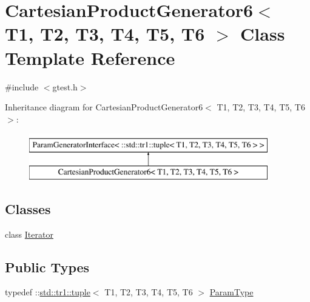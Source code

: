 \hypertarget{classtesting_1_1internal_1_1CartesianProductGenerator6}{\section{\-Cartesian\-Product\-Generator6$<$ \-T1, \-T2, \-T3, \-T4, \-T5, \-T6 $>$ \-Class \-Template \-Reference}
\label{d3/d9a/classtesting_1_1internal_1_1CartesianProductGenerator6}
}


{\ttfamily \#include $<$gtest.\-h$>$}

\-Inheritance diagram for \-Cartesian\-Product\-Generator6$<$ \-T1, \-T2, \-T3, \-T4, \-T5, \-T6 $>$\-:\begin{figure}[H]
\begin{center}
\leavevmode
\includegraphics[height=2.000000cm]{d3/d9a/classtesting_1_1internal_1_1CartesianProductGenerator6}
\end{center}
\end{figure}
\subsection*{\-Classes}
\begin{DoxyCompactItemize}
\item 
class \hyperlink{classtesting_1_1internal_1_1CartesianProductGenerator6_1_1Iterator}{\-Iterator}
\end{DoxyCompactItemize}
\subsection*{\-Public \-Types}
\begin{DoxyCompactItemize}
\item 
typedef \-::\hyperlink{classstd_1_1tr1_1_1tuple}{std\-::tr1\-::tuple}$<$ \-T1, \*
\-T2, \-T3, \-T4, \-T5, \-T6 $>$ \hyperlink{classtesting_1_1internal_1_1CartesianProductGenerator6_a2f46503012c4ef785ad3fe03defbc7e1}{\-Param\-Type}
\end{DoxyCompactItemize}

